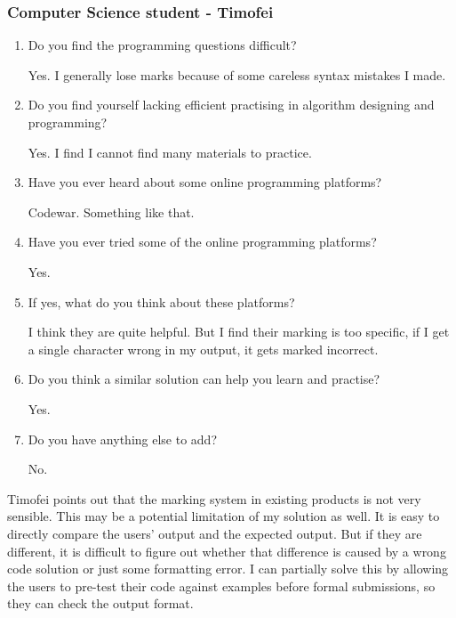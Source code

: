 \documentclass[a4paper]{report}
\begin{document}
\subsubsection{Computer Science student - Timofei}

\begin{enumerate}

    \item Do you find the programming questions difficult?

    Yes. I generally lose marks because of some careless syntax mistakes I made.

    \item Do you find yourself lacking efficient practising in algorithm designing and programming?

    Yes. I find I cannot find many materials to practice.

    \item Have you ever heard about some online programming platforms?

    Codewar. Something like that.

    \item Have you ever tried some of the online programming platforms?

    Yes.

    \item If yes, what do you think about these platforms?

    I think they are quite helpful. But I find their marking is too specific, if I get a single character wrong in my output, it gets marked incorrect.

    \item Do you think a similar solution can help you learn and practise?

    Yes.

    \item Do you have anything else to add?

    No.

\end{enumerate}

Timofei points out that the marking system in existing products is not very sensible. This may be a potential limitation of my solution as well. It is easy to directly compare the users' output and the expected output. But if they are different, it is difficult to figure out whether that difference is caused by a wrong code solution or just some formatting error. I can partially solve this by allowing the users to pre-test their code against examples before formal submissions, so they can check the output format.
\end{document}

